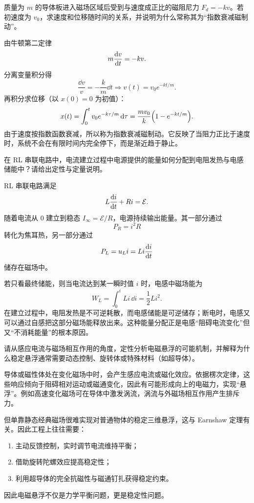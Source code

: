 \begin{university}
质量为 $m$ 的导体板进入磁场区域后受到与速度成正比的磁阻尼力 $F_d=-kv$。若初速度为 $v_0$，求速度和位移随时间的关系，并说明为什么常称其为“指数衰减磁制动”。

\begin{solution}
由牛顿第二定律
\[
m\dv{v}{t}=-kv.
\]
分离变量积分得
\[
\frac{\dd{v}}{v}=-\frac{k}{m}\dd{t}
\Rightarrow v(t)=v_0e^{-kt/m}.
\]
再积分求位移（以 $x(0)=0$ 为初值）：
\[
x(t)=\int_0^t v_0e^{-k\tau/m}\dd{\tau}
=\frac{mv_0}{k}\qty(1-e^{-kt/m}).
\]
由于速度按指数函数衰减，所以称为指数衰减磁制动。它反映了当阻力正比于速度时，系统不会在有限时间内完全停下，而是渐近趋于静止。
\end{solution}
\end{university}

\begin{university}
在 RL 串联电路中，电流建立过程中电源提供的能量如何分配到电阻发热与电感储能中？请给出定性与定量说明。

\begin{solution}
RL 串联电路满足
\[
L\dv{i}{t}+Ri=\mathcal{E}.
\]
随着电流从 $0$ 建立到稳态 $I_\infty=\mathcal{E}/R$，电源持续输出能量。其一部分通过
\[
P_R=i^2R
\]
转化为焦耳热，另一部分通过
\[
P_L=u_L i=L i\dv{i}{t}
\]
储存在磁场中。

若只看最终储能，则当电流达到某一瞬时值 $i$ 时，电感中磁场能为
\[
W_L=\int_0^i Li\,\dd{i}=\frac12 Li^2.
\]
在建立过程中，电阻发热是不可逆耗散，而电感储能是可逆储存；断电时，电感又可以通过自感把这部分磁场能释放出来。这种能量分配正是电感“阻碍电流变化”但又“不消耗能量”的根本原因。
\end{solution}
\end{university}

\begin{problem}
请从感应电流与磁场相互作用的角度，定性分析电磁悬浮的可能机制，并解释为什么稳定悬浮通常需要动态控制、旋转体或特殊材料（如超导体）。

\begin{solution}
导体或磁性体处在变化磁场中时，会产生感应电流或磁化效应。依据楞次定律，这些响应倾向于阻碍相对运动或磁通变化，因此有可能形成向上的电磁力，实现“悬浮”。例如高速变化磁场可在导体中激发涡流，涡流与外磁场相互作用产生排斥力。

但单靠静态经典磁场很难实现对普通物体的稳定三维悬浮，这与 Earnshaw 定理有关。因此工程上往往需要：
\begin{enumerate}
  \item 主动反馈控制，实时调节电流维持平衡；
  \item 借助旋转陀螺效应提高稳定性；
  \item 利用超导体的完全抗磁性与磁通钉扎获得稳定约束。
\end{enumerate}
因此电磁悬浮不仅是力学平衡问题，更是稳定性问题。
\end{solution}
\end{problem}

